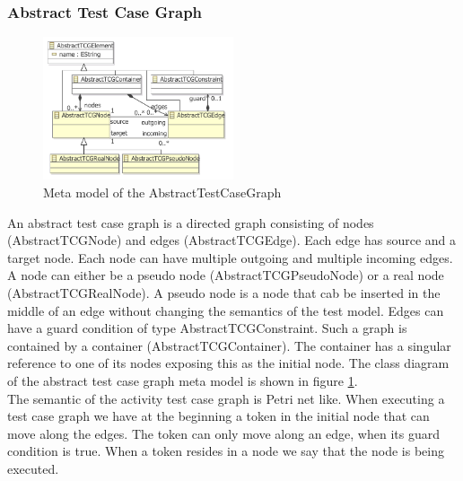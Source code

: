 \subsubsection{Abstract Test Case Graph}
\begin{figure}
\label{fig:AbstractTCGMetaModel}
\includegraphics[width=0.5\textwidth]{./pics/AbstractTestCaseGraph.pdf}
\caption{Meta model of the AbstractTestCaseGraph}
\end{figure}
An abstract test case graph is a directed graph consisting of nodes (AbstractTCGNode) and edges (AbstractTCGEdge). Each edge has source and a target node. Each node can have multiple outgoing and multiple incoming edges.
A node can either be a pseudo node (AbstractTCGPseudoNode) or a real node (AbstractTCGRealNode). A pseudo node is a node that cab be inserted in the middle of an edge without changing the semantics of the test model. Edges can have a guard condition of type AbstractTCGConstraint. Such a graph is contained by a container (AbstractTCGContainer). The container has a singular reference to one of its nodes exposing this as the initial node. The class diagram of the abstract test case graph meta model is shown in figure \ref{fig:AbstractTCGMetaModel}.\\
The semantic of the activity test case graph is Petri net like. When executing a test case graph we have at the beginning a token in the initial node that can move along the edges. The token can only move along an edge, when its guard condition is true. When a token resides in a node we say that the node is being executed.

